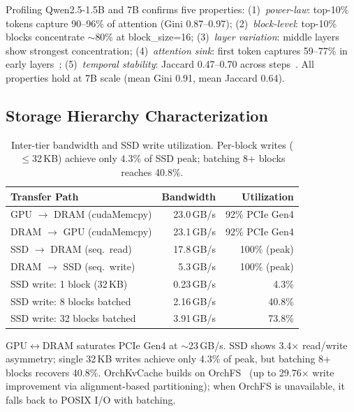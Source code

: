 \documentclass[conference]{IEEEtran}
\begin{document}
Profiling Qwen2.5-1.5B and 7B confirms five properties: (1)~\emph{power-law}: top-10\% tokens capture 90--96\% of attention (Gini 0.87--0.97); (2)~\emph{block-level}: top-10\% blocks concentrate ${\sim}$80\% at block\_size=16; (3)~\emph{layer variation}: middle layers show strongest concentration; (4)~\emph{attention sink}: first token captures 59--77\% in early layers~\cite{streamingllm}; (5)~\emph{temporal stability}: Jaccard 0.47--0.70 across steps~\cite{scissorhands}. All properties hold at 7B scale (mean Gini 0.91, mean Jaccard 0.64).

\subsection{Storage Hierarchy Characterization}
\label{sec:storage-char}

\begin{table}[t]
\centering
\caption{Inter-tier bandwidth and SSD write utilization. Per-block writes ($\leq$32\,KB) achieve only 4.3\% of SSD peak; batching 8+ blocks reaches 40.8\%.}
\label{tab:storage-char}
\small
\begin{tabular}{@{}lrr@{}}
\toprule
Transfer Path & Bandwidth & Utilization \\
\midrule
GPU $\to$ DRAM (cudaMemcpy) & 23.0\,GB/s & 92\% PCIe Gen4 \\
DRAM $\to$ GPU (cudaMemcpy) & 23.1\,GB/s & 92\% PCIe Gen4 \\
SSD $\to$ DRAM (seq.\ read)  & 17.8\,GB/s & 100\% (peak) \\
DRAM $\to$ SSD (seq.\ write) & 5.3\,GB/s & 100\% (peak) \\
\midrule
SSD write: 1 block (32\,KB)  & 0.23\,GB/s & 4.3\% \\
SSD write: 8 blocks batched  & 2.16\,GB/s & 40.8\% \\
SSD write: 32 blocks batched & 3.91\,GB/s & 73.8\% \\
\bottomrule
\end{tabular}
\end{table}

GPU$\leftrightarrow$DRAM saturates PCIe Gen4 at ${\sim}$23\,GB/s. SSD shows 3.4$\times$ read/write asymmetry; single 32\,KB writes achieve only 4.3\% of peak, but batching 8+ blocks recovers 40.8\%. OrchKvCache builds on OrchFS~\cite{orchfs} (up to 29.76$\times$ write improvement via alignment-based partitioning); when OrchFS is unavailable, it falls back to POSIX I/O with batching.

\end{document}
